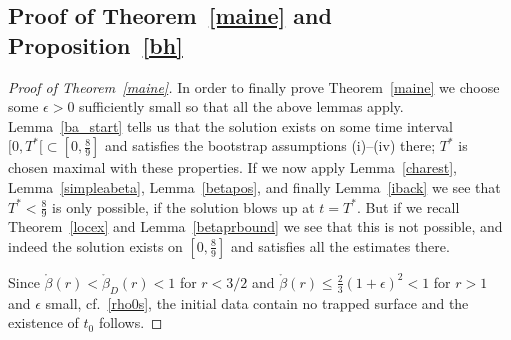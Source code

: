 \documentclass[11pt]{article}
\begin{document}
\subsection{Proof of Theorem~\ref{maine} and Proposition~\ref{bh}}
%
%
\begin{proof}[Proof of Theorem~\ref{maine}]
  In order to finally prove Theorem~\ref{maine} we
  choose some $\epsilon>0$ sufficiently small so that all the above
  lemmas apply. Lemma~\ref{ba_start} tells us that the solution exists
  on some time interval $[0,T^\ast[\subset[0,\frac{8}{9}]$ and satisfies
  the bootstrap assumptions (i)--(iv) there; $T^\ast$ is chosen maximal
  with these properties.
  If we now apply Lemma~\ref{charest}, Lemma~\ref{simpleabeta},
  Lemma~\ref{betapos}, and finally Lemma~\ref{iback} we see that
  $T^\ast < \frac{8}{9}$ is only possible, if the solution blows
  up at $t=T^\ast$. But if we recall Theorem~\ref{locex} and
  Lemma~\ref{betaprbound} we see that this is not possible,
  and indeed the solution exists on $[0,\frac{8}{9}]$ and satisfies
  all the estimates there.
  
  Since $\mathring \beta(r)<\mathring \beta_D(r) < 1$ for $r< 3/2$ and
  $\mathring \beta(r)
  \leq \frac{2}{3} (1+\epsilon)^2 <1$
  for $r>1$ and $\epsilon$ small, cf.~\eqref{rho0s},
  the initial data contain no trapped surface and
  the existence of $t_0$ follows.


\end{proof}
\end{document}
